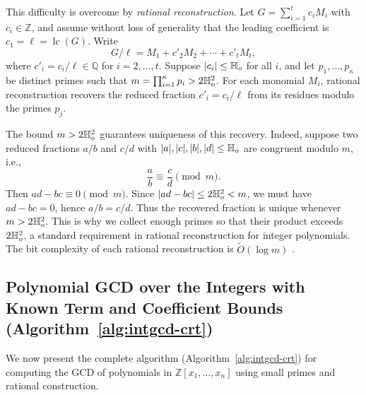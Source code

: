 \documentclass{article}
\numberwithin{equation}{section}
\begin{document}
This difficulty is overcome by \emph{rational reconstruction}. Let $G = \sum_{i=1}^t c_i M_i$ with $c_i \in \mathbb{Z}$, and assume without loss of generality that the leading coefficient is $c_1 = \ell = \operatorname{lc}(G)$. Write
\[
G / \ell = M_1 + c'_2 M_2 + \cdots + c'_t M_t,
\]
where $c'_i = c_i / \ell \in \mathbb{Q}$ for $i = 2, \dots, t$. Suppose $|c_i| \le \mathbb{H}_{o}$ for all $i$, and let $p_1, \dots, p_{\kappa}$ be distinct primes such that $m = \prod_{i=1}^{\kappa} p_i > 2\mathbb{H}_{o}^2$. For each monomial $M_i$, rational reconstruction recovers the reduced fraction $c'_i = c_i / \ell$ from its residues modulo the primes $p_j$.

The bound $m > 2\mathbb{H}_{o}^2$ guarantees uniqueness of this recovery. Indeed, suppose two reduced fractions $a/b$ and $c/d$ with $|a|, |c|, |b|, |d|\le \mathbb{H}_{o}$ are congruent modulo $m$, i.e.,
\[
\frac{a}{b} \equiv \frac{c}{d} \pmod{m}.
\]
Then $ad - bc \equiv 0 \pmod{m}$. Since $|ad - bc| \le 2\mathbb{H}_{o}^2 < m$, we must have $ad - bc = 0$, hence $a/b = c/d$. Thus the recovered fraction is unique whenever $m > 2\mathbb{H}_{o}^2$. This is why we collect enough primes so that their product exceeds $2\mathbb{H}_{o}^2$, a standard requirement in rational reconstruction for integer polynomials. The bit complexity of each rational reconstruction is $\widetilde{O}(\log m)$  \cite{WangPan2003,monagan2004maximal}.




\subsection{Polynomial GCD over the Integers with Known Term and Coefficient Bounds (Algorithm~\ref{alg:intgcd-crt})}
\label{sec:int-crt}

We now present the complete algorithm (Algorithm~\ref{alg:intgcd-crt}) for computing the GCD of polynomials in $\mathbb{Z}[x_1,\dots,x_n]$ using small primes and rational construction.
\end{document}
